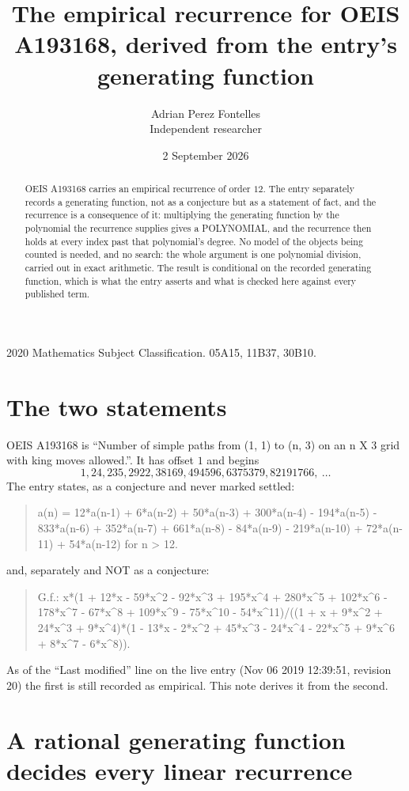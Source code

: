 \documentclass[11pt,a4paper]{article}
\title{The empirical recurrence for OEIS A193168, derived from the entry's generating function}
\author{Adrian Perez Fontelles\\ \small Independent researcher}
\date{2 September 2026}
\theoremstyle{plain}
\theoremstyle{definition}
\begin{document}
\maketitle

\begin{abstract}
OEIS A193168 carries an empirical recurrence of order $12$. The entry separately records a
generating function, not as a conjecture but as a statement of fact, and the recurrence is a
consequence of it: multiplying the generating function by the polynomial the recurrence
supplies gives a POLYNOMIAL, and the recurrence then holds at every index past that
polynomial's degree. No model of the objects being counted is needed, and no search: the
whole argument is one polynomial division, carried out in exact arithmetic. The result is
conditional on the recorded generating function, which is what the entry asserts and what is
checked here against every published term.
\end{abstract}

\noindent\small 2020 Mathematics Subject Classification. 05A15, 11B37, 30B10.\normalsize

\section{The two statements}

OEIS A193168 is ``Number of simple paths from (1, 1) to (n, 3) on an n X 3 grid with king moves allowed.''. It has offset $1$ and begins
\[
1, 24, 235, 2922, 38169, 494596, 6375379, 82191766,\ \dots
\]
The entry states, as a conjecture and never marked settled:
\begin{quote}
a(n) = 12*a(n-1) + 6*a(n-2) + 50*a(n-3) + 300*a(n-4) - 194*a(n-5) - 833*a(n-6) + 352*a(n-7) + 661*a(n-8) - 84*a(n-9) - 219*a(n-10) + 72*a(n-11) + 54*a(n-12) for n > 12.
\end{quote}
and, separately and NOT as a conjecture:
\begin{quote}
G.f.: x*(1 + 12*x - 59*x\^{}2 - 92*x\^{}3 + 195*x\^{}4 + 280*x\^{}5 + 102*x\^{}6 - 178*x\^{}7 - 67*x\^{}8 + 109*x\^{}9 - 75*x\^{}10 - 54*x\^{}11)/((1 + x + 9*x\^{}2 + 24*x\^{}3 + 9*x\^{}4)*(1 - 13*x - 2*x\^{}2 + 45*x\^{}3 - 24*x\^{}4 - 22*x\^{}5 + 9*x\^{}6 + 8*x\^{}7 - 6*x\^{}8)).
\end{quote}
As of the ``Last modified'' line on the live entry (Nov 06 2019 12:39:51, revision 20) the first is still
recorded as empirical. This note derives it from the second.

\section{A rational generating function decides every linear recurrence}
\end{document}
